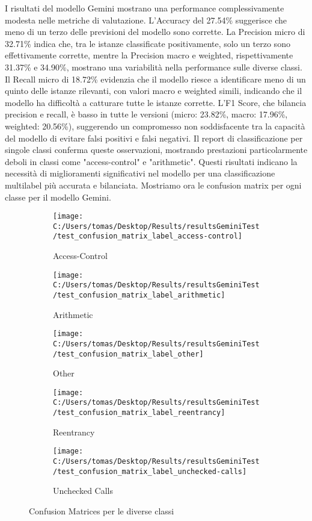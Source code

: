 \documentclass[../../Thesis.tex]{subfiles}
\begin{document}
I risultati del modello Gemini mostrano una performance complessivamente modesta nelle metriche di valutazione. L'Accuracy del 27.54\% suggerisce che meno di un terzo delle previsioni del modello sono corrette. La Precision micro di 32.71\% indica che, tra le istanze classificate positivamente, solo un terzo sono effettivamente corrette, mentre la Precision macro e weighted, rispettivamente 31.37\% e 34.90\%, mostrano una variabilità nella performance sulle diverse classi. Il Recall micro di 18.72\% evidenzia che il modello riesce a identificare meno di un quinto delle istanze rilevanti, con valori macro e weighted simili, indicando che il modello ha difficoltà a catturare tutte le istanze corrette. L'F1 Score, che bilancia precision e recall, è basso in tutte le versioni (micro: 23.82\%, macro: 17.96\%, weighted: 20.56\%), suggerendo un compromesso non soddisfacente tra la capacità del modello di evitare falsi positivi e falsi negativi. Il report di classificazione per singole classi conferma queste osservazioni, mostrando prestazioni particolarmente deboli in classi come "access-control" e "arithmetic". Questi risultati indicano la necessità di miglioramenti significativi nel modello per una classificazione multilabel più accurata e bilanciata. Mostriamo ora le confusion matrix per ogni classe per il modello Gemini.
\begin{figure}[h!]
    \centering
    \begin{subfigure}[b]{0.1999\textwidth}
        \centering
        \texttt{[image: C:/Users/tomas/Desktop/Results/resultsGeminiTest/test\_confusion\_matrix\_label\_access-control]}
        \caption{Access-Control}
    \end{subfigure}
    \begin{subfigure}[b]{0.1999\textwidth}
        \centering
        \texttt{[image: C:/Users/tomas/Desktop/Results/resultsGeminiTest/test\_confusion\_matrix\_label\_arithmetic]}
        \caption{Arithmetic}
    \end{subfigure}
    \begin{subfigure}[b]{0.1999\textwidth}
        \centering
        \texttt{[image: C:/Users/tomas/Desktop/Results/resultsGeminiTest/test\_confusion\_matrix\_label\_other]}
        \caption{Other}
    \end{subfigure}
    \begin{subfigure}[b]{0.1999\textwidth}
        \centering
        \texttt{[image: C:/Users/tomas/Desktop/Results/resultsGeminiTest/test\_confusion\_matrix\_label\_reentrancy]}
        \caption{Reentrancy}
    \end{subfigure}
    \begin{subfigure}[b]{0.1999\textwidth}
        \centering
        \texttt{[image: C:/Users/tomas/Desktop/Results/resultsGeminiTest/test\_confusion\_matrix\_label\_unchecked-calls]}
        \caption{Unchecked Calls}
    \end{subfigure}
    \caption{Confusion Matrices per le diverse classi}
\end{figure}
\end{document}
